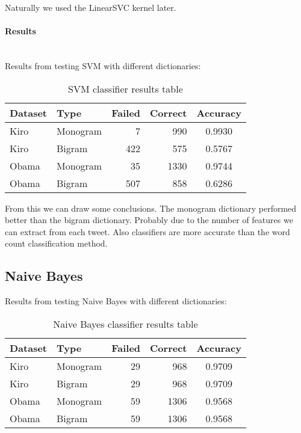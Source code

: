 Naturally we used the LinearSVC kernel later. 

\paragraph{Results}
\hspace{0pt}\\
Results from testing SVM with different dictionaries: 

\begin{table}
\centering
\label{tbl:svm_classifier_results}
\caption{SVM classifier results table}
\begin{tabular}{ l l r r c }
Dataset & Type & Failed & Correct & Accuracy \\
\hline
Kiro & Monogram & 7 & 990 & 0.9930 \\
Kiro & Bigram & 422 & 575 & 0.5767 \\
Obama & Monogram & 35 & 1330 & 0.9744 \\
Obama & Bigram & 507 & 858 & 0.6286 \\
\end{tabular}
\end{table}

From this we can draw some conclusions. The monogram dictionary performed
better than the bigram dictionary. Probably due to the number of features we
can extract from each tweet. Also classifiers are more accurate than the word
count classification method.  
%

\subsection{Naive Bayes}\label{sentiment:naive_bayes_classification}
Results from testing Naive Bayes with different dictionaries: 

\begin{table}
\centering
\label{tbl:naive_bayes_classification_results}
\caption{Naive Bayes classifier results table}
\begin{tabular}{ l l r r c }
Dataset & Type & Failed & Correct & Accuracy \\
\hline
Kiro & Monogram & 29 & 968 & 0.9709 \\
Kiro & Bigram & 29 & 968 & 0.9709 \\
Obama & Monogram & 59 & 1306 & 0.9568 \\
Obama & Bigram & 59 & 1306 & 0.9568 \\
\end{tabular}
\end{table}

